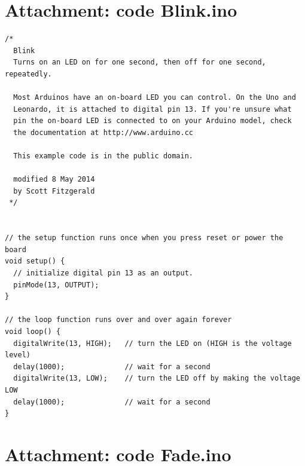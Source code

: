 \documentclass{arduino}
\begin{document}
\newpage

\section{Attachment: code Blink.ino}

\begin{minipage}{\widemargin}
\begin{lstlisting}
/*
  Blink
  Turns on an LED on for one second, then off for one second, repeatedly.

  Most Arduinos have an on-board LED you can control. On the Uno and
  Leonardo, it is attached to digital pin 13. If you're unsure what
  pin the on-board LED is connected to on your Arduino model, check
  the documentation at http://www.arduino.cc

  This example code is in the public domain.

  modified 8 May 2014
  by Scott Fitzgerald
 */


// the setup function runs once when you press reset or power the board
void setup() {
  // initialize digital pin 13 as an output.
  pinMode(13, OUTPUT);
}

// the loop function runs over and over again forever
void loop() {
  digitalWrite(13, HIGH);   // turn the LED on (HIGH is the voltage level)
  delay(1000);              // wait for a second
  digitalWrite(13, LOW);    // turn the LED off by making the voltage LOW
  delay(1000);              // wait for a second
}
\end{lstlisting}
\end{minipage}

\newpage

\section{Attachment: code Fade.ino}
\end{document}
